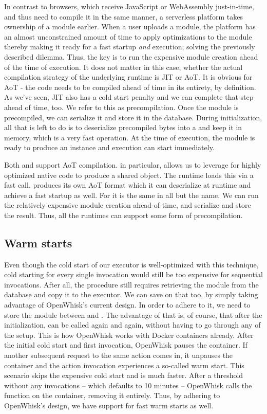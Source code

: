 In contrast to browsers, which receive JavaScript or WebAssembly just-in-time, and thus need to compile it in the same manner, a serverless platform takes ownership of a module earlier. When a user uploads a module, the platform has an almost unconstrained amount of time to apply optimizations to the module thereby making it ready for a fast startup \emph{and} execution; solving the previously described dilemma. Thus, the key is to run the expensive module creation ahead of the time of execution. It does not matter in this case, whether the actual compilation strategy of the underlying runtime is JIT or AoT. It is obvious for AoT - the code needs to be compiled ahead of time in its entirety, by definition. As we've seen, JIT also has a cold start penalty and we can complete that step ahead of time, too. We refer to this as precompilation. Once the module is precompiled, we can serialize it and store it in the database. During initialization, all that is left to do is to deserialize precompiled bytes into a  and keep it in memory, which is a very fast operation. At the time of execution, the module is ready to produce an instance and execution can start immediately.

Both  and  support AoT compilation.  in particular, allows us to leverage  for highly optimized native code to produce a shared object. The runtime loads this via a fast  call.  produces its own AoT format which it can deserialize at runtime and achieve a fast startup as well. For  it is the same in all but the name. We can run the relatively expensive module creation ahead-of-time, and serialize and store the result. Thus, all the runtimes can support some form of precompilation.

\subsection{Warm starts}

Even though the cold start of our executor is well-optimized with this technique, cold starting for every single invocation would still be too expensive for sequential invocations. After all, the  procedure still requires retrieving the module from the database and copy it to the executor. We can save on that too, by simply taking advantage of OpenWhisk's current design. In order to adhere to it, we need to store the module between  and . The advantage of that is, of course, that after the initialization,  can be called again and again, without having to go through any of the setup. This is how OpenWhisk works with Docker containers already. After the initial cold start and first invocation, OpenWhisk pauses the container. If another subsequent request to the same action comes in, it unpauses the container and the action invocation experiences a so-called warm start. This scenario skips the expensive cold start and is much faster. After a threshold without any invocations -- which defaults to 10 minutes -- OpenWhisk calls the  function on the container, removing it entirely.
Thus, by adhering to OpenWhisk's design, we have support for fast warm starts as well.

